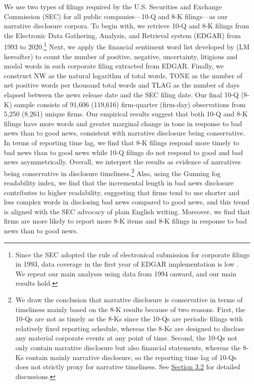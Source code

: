\documentclass[letterpaper,11pt]{article}
\begin{document}
\begin{spacing}{1.5}
We use two types of filings required by the U.S. Securities and Exchange Commission (SEC) for all public companies---10-Q and 8-K filings---as our narrative disclosure corpora. To begin with, we retrieve 10-Q and 8-K filings from the Electronic Data Gathering, Analysis, and Retrieval system (EDGAR) from 1993 to 2020.\footnote{Since the SEC adopted the rule of electronical submission for corporate filings in 1993, data coverage in the first year of EDGAR implementation is low . We repeat our main analyses using data from 1994 onward, and our main results hold.} Next, we apply the financial sentiment word list developed by  (LM hereafter) to count the number of positive, negative, uncertainty, litigious and modal words in each corporate filing extracted from EDGAR. Finally, we construct NW as the natural logarithm of total words, TONE as the number of net positive words per thousand total words and TLAG as the number of days elapsed between the news release date and the SEC filing date. Our final 10-Q (8-K) sample consists of 91,606 (119,616) firm-quarter (firm-day) observations from 5,250 (8,261) unique firms. Our empirical results suggest that both 10-Q and 8-K filings have more words and greater marginal change in tone in response to bad news than to good news, consistent with narrative disclosure being conservative. In terms of reporting time lag, we find that 8-K filings respond more timely to bad news than to good news while 10-Q filings do not respond to good and bad news asymmetrically. Overall, we interpret the results as evidence of narratives being conservative in disclosure timeliness.\footnote{We draw the conclusion that narrative disclosure is conservative in terms of timeliness mainly based on the 8-K results because of two reasons. First, the 10-Qs are not as timely as the 8-Ks since the 10-Qs are periodic filings with relatively fixed reporting schedule, whereas the 8-Ks are designed to disclose any material corporate events at any point of time. Second, the 10-Qs not only contain narrative disclosure but also financial statements, whereas the 8-Ks contain mainly narrative disclosure, so the reporting time lag of 10-Qs does not strictly proxy for narrative timeliness. See \hyperref[sec3.2]{Section 3.2} for detailed discussions. } Also, using the Gunning fog readability index, we find that the incremental length in bad news disclosure contributes to higher readability, suggesting that firms tend to use shorter and less complex words in disclosing bad news compared to good news, and this trend is aligned with the SEC advocacy of plain English writing. Moreover, we find that firms are more likely to report more 8-K items and 8-K filings in response to bad news than to good news. 


\end{spacing}
\end{document}
